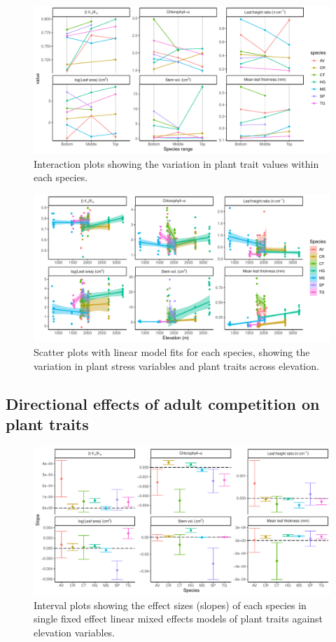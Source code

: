 \documentclass[a4paper, 11pt]{article}
\begin{document}
\begin{figure}[H]
\includegraphics[width=\textwidth]{spaghetti}
\centering
\caption{Interaction plots showing the variation in plant trait values within each species.}
\label{spaghetti}
\end{figure}

\begin{figure}[H]
\includegraphics[width=\textwidth]{traits_elev_scatter}
\centering
\caption{Scatter plots with linear model fits for each species, showing the variation in plant stress variables and plant traits across elevation.}
\label{traits_elev_scatter}
\end{figure}

\subsection{Directional effects of adult competition on plant traits}

\begin{figure}[H]
\includegraphics[width=\textwidth]{traits_elev_slopes}
\centering
\caption{Interval plots showing the effect sizes (slopes) of each species in single fixed effect linear mixed effects models of plant traits against elevation variables.}
\label{traits_elev_slopes}
\end{figure}
\end{document}
